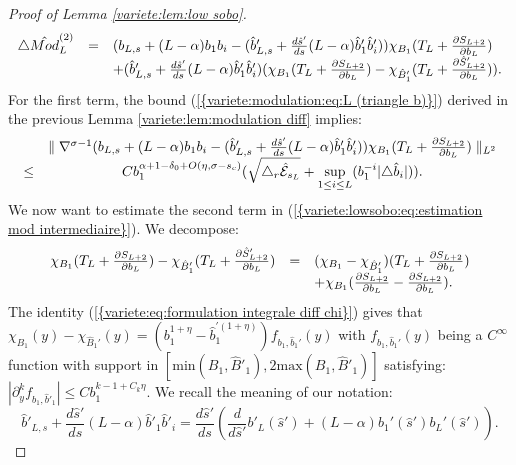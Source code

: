 \documentclass[11pt,a4paper,reqno]{amsart}
\theoremstyle{remark}
\numberwithin{equation}{section}
\begin{document}
\begin{proof}[Proof of Lemma \ref{variete:lem:low sobo}]
\begin{equation} \label{variete:lowsobo:eq:estimation mod intermediaire}
\begin{array}{r c l}
\triangle \hat{Mod}_L^{(2)}&=& (b_{L,s}+(L-\alpha)b_1b_i-(\hat{b}'_{L,s}+\frac{d\hat{s}'}{ds}(L-\alpha)\hat{b}'_1\hat{b}'_i))\chi_{B_1}(T_L+\frac{\partial S_{L+2}}{\partial b_L})\\
&&+(\hat{b}'_{L,s}+\frac{d\hat{s}'}{ds}(L-\alpha)\hat{b}'_1\hat{b}'_i)(\chi_{B_1}(T_L+\frac{\partial S_{L+2}}{\partial b_L})-\chi_{\hat{B}'_1}(T_L+\frac{\partial \hat{S}'_{L+2}}{\partial b_L})).
\end{array}
\end{equation}
For the first term, the bound {{\rm (\ref{{variete:modulation:eq:L (triangle b)}})}} derived in the previous Lemma \ref{variete:lem:modulation diff} implies:
\begin{equation} \label{variete:lowsobo:eq:estimation mod intermediaire 2}
\begin{array}{r c l}
&\parallel \nabla^{\sigma-1}(b_{L,s}+(L-\alpha)b_1b_i-(\hat{b}'_{L,s}+\frac{d\hat{s}'}{ds}(L-\alpha)\hat{b}'_1\hat{b}'_i))\chi_{B_1}(T_L+\frac{\partial S_{L+2}}{\partial b_L}) \parallel_{L^2}\\
\leq& Cb_1^{\alpha+1-\delta_0+O(\eta,\sigma-s_c)}(\sqrt{\triangle_r \hat{\mathcal{E}}_{s_L}}+\underset{1\leq i \leq L}{\text{sup}}(b_1^{-i}|\triangle \hat{b}_i|)).
\end{array}
\end{equation}
We now want to estimate the second term in {{\rm (\ref{{variete:lowsobo:eq:estimation mod intermediaire}})}}. We decompose:
$$
\begin{array}{r c l}
\chi_{B_1}(T_L+\frac{\partial S_{L+2}}{\partial b_L})-\chi_{\hat{B}'_1}(T_L+\frac{\partial \hat{S}'_{L+2}}{\partial b_L})&=&(\chi_{B_1}-\chi_{\hat{B}_1'})(T_L+\frac{\partial S_{L+2}}{\partial b_L})\\
&&+\chi_{B_1}(\frac{\partial S_{L+2}}{\partial b_L}-\frac{\partial S_{L+2}}{\partial b_L}).
\end{array}
$$
The identity {{\rm (\ref{{variete:eq:formulation integrale diff chi}})}} gives that $\chi_{B_1}(y)-\chi_{\hat{B}_1'}(y)=(b_1^{1+\eta}-\hat{b}_1^{'(1+\eta)} )f_{b_1,\hat{b}_1'}(y)$ with $f_{b_1,\hat{b}_1'}(y)$ being a $C^{\infty}$ function with support in $[\text{min}(B_1,\hat{B}'_1),2\text{max}(B_1,\hat{B}'_1)]$ satisfying: $|\partial_y^k f_{b_1,\hat{b}'_1}|\leq Cb_1^{k-1+C_k\eta}$. We recall the meaning of our notation:
$$
\hat{b}'_{L,s}+\frac{d\hat{s}'}{ds}(L-\alpha)\hat{b}'_1\hat{b}'_i=\frac{d\hat{s}'}{ds}\left (\frac{d}{d\hat{s}'}b'_L(\hat{s}')+(L-\alpha)b_1'(\hat{s}')b_L'(\hat{s}') \right).
$$
\end{proof}
\end{document}
